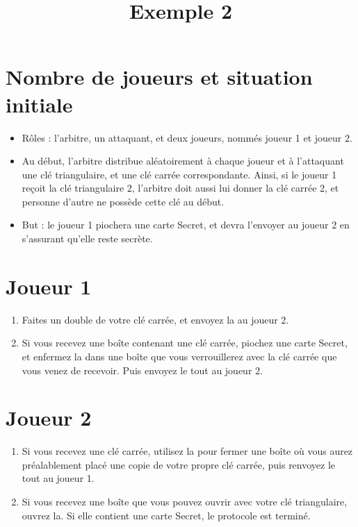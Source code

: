 \documentclass[a4paper,10pt]{article}
\title{Exemple 2}
\date{}
\begin{document}
\maketitle

\section{Nombre de joueurs et situation initiale}
\begin{itemize}
	\item Rôles : l'arbitre, un attaquant, et deux joueurs, nommés joueur 1 et joueur 2.
	\item Au début, l'arbitre distribue aléatoirement à chaque joueur et à l'attaquant une clé triangulaire, et une clé carrée correspondante. Ainsi, si le joueur 1 reçoit la clé triangulaire 2, l'arbitre doit aussi lui donner la clé carrée 2, et personne d'autre ne possède cette clé au début.
	\item But : le joueur 1 piochera une carte Secret, et devra l'envoyer au joueur 2 en s'assurant qu'elle reste secrète.
\end{itemize}




\section{Joueur 1}
\begin{enumerate}
	\item Faites un double de votre clé carrée, et envoyez la au joueur 2.
	\item Si vous recevez une boîte contenant une clé carrée, piochez une carte Secret, et enfermez la dans une boîte que vous verrouillerez avec la clé carrée que vous venez de recevoir. Puis envoyez le tout au joueur 2.
\end{enumerate}

\section{Joueur 2}
\begin{enumerate}
	\item Si vous recevez une clé carrée, utilisez la pour fermer une boîte où vous aurez préalablement placé une copie de votre propre clé carrée, puis renvoyez le tout au joueur 1.
	\item Si vous recevez une boîte que vous pouvez ouvrir avec votre clé triangulaire, ouvrez la. Si elle contient une carte Secret, le protocole est terminé.
\end{enumerate}
\end{document}
